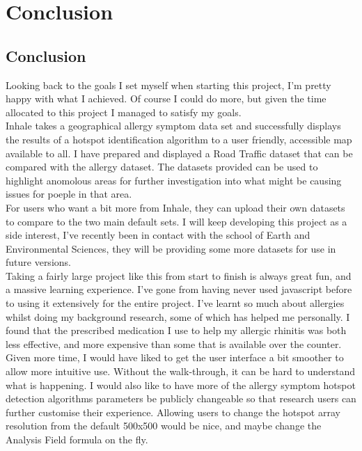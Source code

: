 \chapter{Conclusion}
\label{cha:conc}

\section{Conclusion}

Looking back to the goals I set myself when starting this project, I'm pretty happy with what I achieved. Of course I could do more, but given the time allocated to this project I managed to satisfy my goals.\\

Inhale takes a geographical allergy symptom data set and successfully displays the results of a hotspot identification algorithm to a user friendly, accessible map available to all. I have prepared and displayed a Road Traffic dataset that can be compared with the allergy dataset. The datasets provided can be used to highlight anomolous areas for further investigation into what might be causing issues for poeple in that area.\\

For users who want a bit more from Inhale, they can upload their own datasets to compare to the two main default sets. I will keep developing this project as a side interest, I've recently been in contact with the school of Earth and Environmental Sciences, they will be providing some more datasets for use in future versions.\\

Taking a fairly large project like this from start to finish is always great fun, and a massive learning experience. I've gone from having never used javascript before to using it extensively for the entire project. I've learnt so much about allergies whilst doing my background research, some of which has helped me personally. I found that the prescribed medication I use to help my allergic rhinitis was both less effective, and more expensive than some that is available over the counter.\\

Given more time, I would have liked to get the user interface a bit smoother to allow more intuitive use. Without the walk-through, it can be hard to understand what is happening. I would also like to have more of the allergy symptom hotspot detection algorithms parameters be publicly changeable so that research users can further customise their experience. Allowing users to change the hotspot array resolution from the default 500x500 would be nice, and maybe change the Analysis Field formula on the fly.\\

